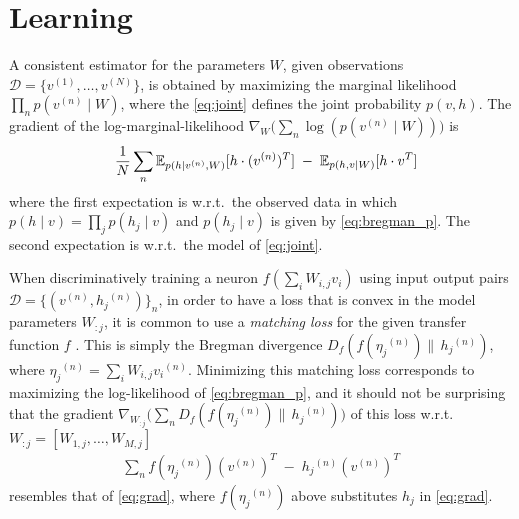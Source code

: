 \documentclass[twoside]{article}
\theoremstyle{plain}
\theoremstyle{definition}
\theoremstyle{remark}
\newcommand{\wrt}{w.r.t.~}
\newcommand{\refEq}[1]{\cref{#1}}%
\newcommand{\boldit}[1]{\ensuremath{#1}}
\newcommand{\sfit}[1]{\ensuremath{#1}}
\newcommand{\xx}[0]{\ensuremath{\boldit{v}}}%
\newcommand{\x}[0]{\ensuremath{{v}}}%
\newcommand{\yy}[0]{\ensuremath{\boldit{h}}}%
\newcommand{\y}[0]{\ensuremath{{h}}}%
\newcommand{\WW}[0]{\ensuremath{\boldit{W}}}%
\newcommand{\pp}[0]{\ensuremath{\sfit{p}}}%
\newcommand{\ff}[0]{\ensuremath{\sfit{f}}}%
\newcommand{\DD}[0]{\ensuremath{\boldit{\sfit{D}}}}%
\newcommand{\EE}[0]{\ensuremath{\mathbb{E}}}%
\newcommand{\nn}[1]{\ensuremath{^{(#1)}}}%
\begin{document}
\section{Learning}\label{sec:learning}
A consistent estimator for the parameters $\WW$, given observations $\mathcal{D} = \{\xx\nn{1},\ldots,\xx\nn{N}\}$, is obtained by maximizing the marginal likelihood $\prod_{n}\pp(\xx\nn{n} \mid \WW)$, where the \refEq{eq:joint} defines the joint probability $\pp(\xx, \yy)$. 
The gradient of the log-marginal-likelihood $\nabla_{\WW} \big (\sum_{n} \log(\pp(\xx\nn{n} \mid \WW)) \big )$ is %
\begin{align}\label{eq:grad}
\frac{1}{N}\sum_{n} \EE_{\pp(\yy \mid \xx\nn{n}, \WW)} [\yy  \cdot (\xx\nn{n})^T] \; - \; \EE_{\pp(\yy, \xx \mid \WW)} [ \yy \cdot  \xx^T] \hspace{-.1in}
\end{align}
where the first expectation is \wrt the observed data 
in which $\pp(\yy \mid \xx) = \prod_j\pp(\y_j \mid \xx)$ and $\pp(\y_j \mid \xx)$ is given by \refEq{eq:bregman_p}. The second expectation is \wrt the model of \refEq{eq:joint}. 

When discriminatively training a neuron $\ff(\sum_{i} W_{i,j} \x_i)$ using input output pairs $\mathcal{D}=\{(\xx\nn{n}, \y_j\nn{n})\}_n$, 
in order to have a loss that is convex in the model parameters $\WW_{:j}$, it is common
to use a \textit{matching loss} for the given transfer function $\ff$ \citep{helmbold1999relative}. This is simply the Bregman divergence $\DD_\ff(\ff(\eta_j\nn{n}) \|\, \y_j\nn{n})$, 
where $\eta_j\nn{n} = \sum_{i} W_{i,j} \x_i\nn{n}$.
Minimizing this matching loss corresponds to maximizing the log-likelihood of \refEq{eq:bregman_p},
and it should not be surprising that the gradient $\nabla_{\WW_{:j}} \big (\sum_{n} \DD_{\ff}(\ff(\eta_j\nn{n}) \|\, \y_j\nn{n}) \big )$ of this loss \wrt $\WW_{:j} = [W_{1,j},\ldots,W_{M,j}]$ 
\begin{align*}  
\sum_{n} \ff(\eta_j\nn{n}) (\xx\nn{n})^T\;  -\; \y_j\nn{n}(\xx\nn{n})^T
\end{align*}
resembles that of \refEq{eq:grad}, where $\ff(\eta_j\nn{n})$ above substitutes $\y_j$ in \refEq{eq:grad}.
\end{document}

